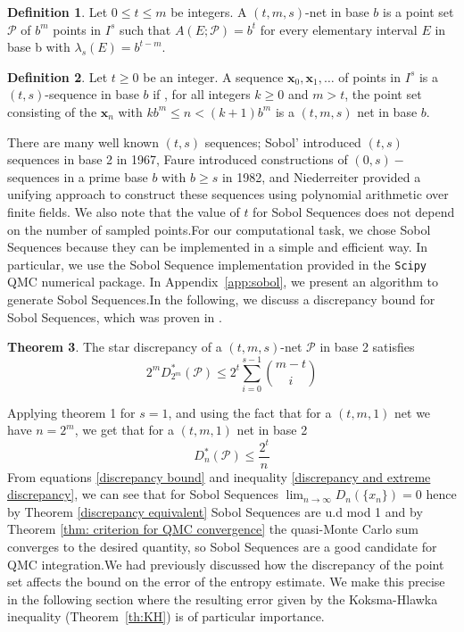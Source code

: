 \documentclass{article}
\theoremstyle{definition}
\newtheorem{definition}{Definition}[section]
\newtheorem{theorem}[definition]{Theorem}
\begin{document}
\begin{definition}
Let $0\leq t\leq m$ be integers. A $(t,m,s)$-net in base $b$ is a point set $\mathcal{P}$ of $b^m$ points in $I^s$ such that $A(E;\mathcal{P})=b^t$ for every elementary interval $E$ in base b with $\lambda_s(E)=b^{t-m}$.
\end{definition}

\begin{definition}
Let $t\geq 0$ be an integer. A sequence $\mathbf{x}_0,\mathbf{x}_1,\ldots$ of points in $I^s$ is a $(t,s)$-sequence in base $b$ if , for all integers $k\geq 0$ and $m> t$, the point set consisting of the $\mathbf{x}_n$ with $kb^m\leq n< (k+1)b^m$ is a $(t,m,s)$ net in base $b$.
\end{definition}

\noindent There are many well known $(t,s)$ sequences; Sobol' introduced $(t,s)$ sequences in base 2 in 1967,  Faure introduced constructions of $(0,s)-$sequences in a prime base $b$ with $b\geq s$ in 1982, and Niederreiter provided a unifying approach to construct these sequences using polynomial arithmetic over finite fields. We also note that the value of $t$ for Sobol Sequences does not depend on the number of sampled points\cite{DickJosef2010D}.For our computational task, we chose Sobol Sequences because they can be implemented in a simple and efficient way. In particular, we use the Sobol Sequence implementation provided in the \texttt{Scipy} QMC numerical package. In Appendix~\ref{app:sobol}, we present an algorithm to generate Sobol Sequences.In the following, we discuss a discrepancy bound for Sobol Sequences, which was proven in \cite{DickJosef2010D}.

\begin{theorem}
\label{th:discb2}
The star discrepancy of  a $(t,m,s)$-net $\mathcal{P}$ in base 2 satisfies \begin{equation}
    2^m D^{\ast}_{2^m}(\mathcal{P})\leq 2^t \sum_{i=0}^{s-1} \binom{m-t}{i}
\end{equation} 
\end{theorem}

\noindent Applying theorem 1 for $s=1$, and using the fact that for a $(t,m,1)$ net we have $n=2^m$,  we get that for a $(t,m,1)$ net in base 2
\begin{equation}\label{discrepancy bound}
    D_n^{\ast}(\mathcal{P})\leq \frac{2^t}{n}
\end{equation}
From equations \eqref{discrepancy bound} and inequality \eqref{discrepancy and extreme discrepancy}, we can see that for Sobol Sequences $\lim_{n\to\infty}D_n(\{x_n\})=0$ hence  by Theorem \ref{discrepancy equivalent} Sobol Sequences are u.d mod 1 and by Theorem \ref{thm: criterion for QMC convergence} the quasi-Monte Carlo sum converges to the desired quantity, so Sobol Sequences are a good candidate for QMC integration.We had previously discussed how the discrepancy of the point set affects the bound on the error of the entropy estimate. We make this precise in the following section where the resulting error given by the Koksma-Hlawka inequality (Theorem~\ref{th:KH}) is of particular importance.
\end{document}
